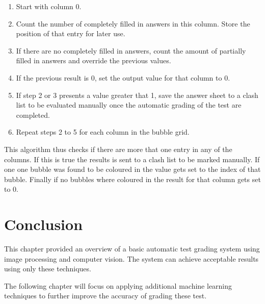 \begin{enumerate}
\item Start with column 0.
\item Count the number of completely filled in answers in this column. Store the position of that entry for later use.
\item If there are no completely filled in answers, count the amount of partially filled in answers and override the previous values.
\item If the previous result is 0, set the output value for that column to 0.
\item If step 2 or 3 presents a value greater that 1, save the answer sheet to a clash list to be evaluated manually once the automatic grading of the test are completed.
\item Repeat steps 2 to 5 for each column in the bubble grid.
\end{enumerate}

This algorithm thus checks if there are more that one entry in any of the columns. If this is true the results is sent to a clash list to be marked manually. If one one bubble was found to be coloured in the value gets set to the index of that bubble. Finally if no bubbles where coloured in the result for that column gets set to 0.

\section{Conclusion}

This chapter provided an overview of a basic automatic test grading system using image processing and computer vision. The system can achieve acceptable results using only these techniques.

The following chapter will focus on applying additional machine learning techniques to further improve the accuracy of grading these test.